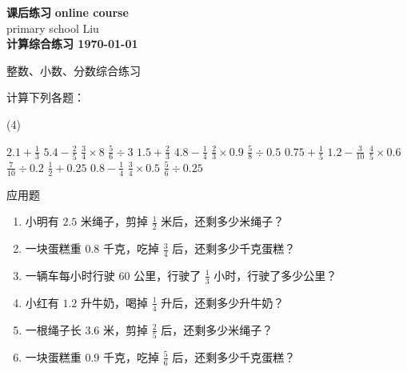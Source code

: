 \documentclass[DIN, pagenumber=false, fontsize=11pt, parskip=half]{scrartcl}
\newcommand{\mytitle}[1]{{\noindent\Large\textbf{#1}}}
\begin{document}
\noindent\textbf{课后练习} \hfill \textbf{online course}\\
primary school \hfill Liu\\

\mytitle{计算综合练习 \hfill \today}
\newline
\begin{parchmentquote}
   整数、小数、分数综合练习

\end{parchmentquote}



   计算下列各题：
  \begin{tasks}(4)
      
        \task[1.]\quad $2.1 + \frac{1}{3}$
        \task[2.]\quad $5.4 - \frac{2}{5}$
        \task[3.]\quad $\frac{3}{4} \times 8$
        \task[4.]\quad $\frac{5}{6} \div 3$
        \task[5.]\quad $1.5 + \frac{2}{3}$
        \task[6.]\quad $4.8 - \frac{1}{4}$
        \task[7.]\quad $\frac{2}{3} \times 0.9$
        \task[8.]\quad $\frac{5}{8} \div 0.5$
        \task[9.]\quad $0.75 + \frac{1}{5}$
        \task[10.]\quad $1.2 - \frac{3}{10}$
        \task[11.]\quad $\frac{4}{5} \times 0.6$
        \task[12.]\quad $\frac{7}{10} \div 0.2$
        \task[13.]\quad $\frac{1}{2} + 0.25$
        \task[14.]\quad $0.8 - \frac{1}{4}$  
        \task[15.]\quad $\frac{3}{4} \times 0.5$
        \task[16.]\quad $\frac{5}{6} \div 0.25$
        \end{tasks}
 应用题
 \begin{enumerate}
     \item 小明有 $2.5$ 米绳子，剪掉 $\frac{1}{2}$ 米后，还剩多少米绳子？
     \item 一块蛋糕重 $0.8$ 千克，吃掉 $\frac{3}{4}$ 后，还剩多少千克蛋糕？
     \item 一辆车每小时行驶 $60$ 公里，行驶了 $\frac{1}{3}$ 小时，行驶了多少公里？
     \item 小红有 $1.2$ 升牛奶，喝掉 $\frac{1}{4}$ 升后，还剩多少升牛奶？
     \item 一根绳子长 $3.6$ 米，剪掉 $\frac{2}{5}$ 后，还剩多少米绳子？
     \item 一块蛋糕重 $0.9$ 千克，吃掉 $\frac{5}{6}$ 后，还剩多少千克蛋糕？
     \end{enumerate}
\end{document}
